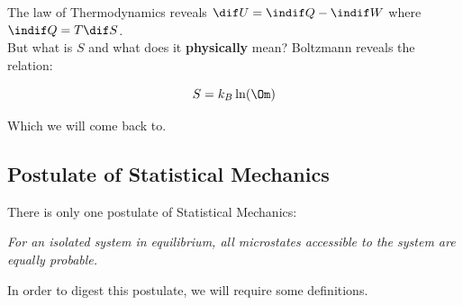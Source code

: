 \documentclass{article}
\begin{document}
The  law of Thermodynamics reveals $\dif U = \indif Q - \indif W$ where $\indif Q = T \dif S$. \\

But what is $S$ and what does it \textbf{physically} mean? Boltzmann reveals the relation:

\[ S = k_B \ln (\Om) \]

Which we will come back to.

\subsection{Postulate of Statistical Mechanics}
\label{sec:postsm}
There is only one postulate of Statistical Mechanics:
\begin{displayquote}
        \textit{For an isolated system in equilibrium, all microstates accessible to the system are equally probable.}
\end{displayquote}

In order to digest this postulate, we will require some definitions.

\end{document}
